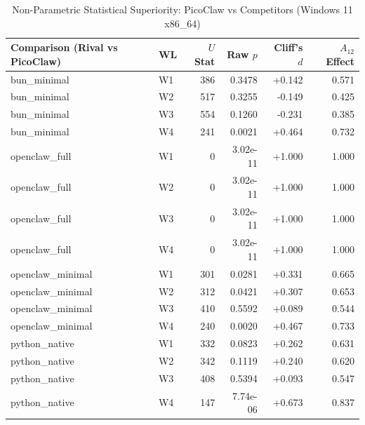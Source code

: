 \begin{table}[t]
\centering\small
\caption{Non-Parametric Statistical Superiority: PicoClaw vs Competitors (Windows 11 x86_64)}
\label{tab:Windows_stat_tests}
\begin{tabular}{llrrrr}
\toprule
Comparison (Rival vs PicoClaw) & WL & $U$ Stat & Raw $p$ & Cliff's $d$ & $A_{12}$ Effect \\
\midrule
bun\_minimal & W1 & 386 & 0.3478 & +0.142 & 0.571 \\
bun\_minimal & W2 & 517 & 0.3255 & -0.149 & 0.425 \\
bun\_minimal & W3 & 554 & 0.1260 & -0.231 & 0.385 \\
bun\_minimal & W4 & 241 & 0.0021 & +0.464 & 0.732 \\
openclaw\_full & W1 & 0 & 3.02e-11 & +1.000 & 1.000 \\
openclaw\_full & W2 & 0 & 3.02e-11 & +1.000 & 1.000 \\
openclaw\_full & W3 & 0 & 3.02e-11 & +1.000 & 1.000 \\
openclaw\_full & W4 & 0 & 3.02e-11 & +1.000 & 1.000 \\
openclaw\_minimal & W1 & 301 & 0.0281 & +0.331 & 0.665 \\
openclaw\_minimal & W2 & 312 & 0.0421 & +0.307 & 0.653 \\
openclaw\_minimal & W3 & 410 & 0.5592 & +0.089 & 0.544 \\
openclaw\_minimal & W4 & 240 & 0.0020 & +0.467 & 0.733 \\
python\_native & W1 & 332 & 0.0823 & +0.262 & 0.631 \\
python\_native & W2 & 342 & 0.1119 & +0.240 & 0.620 \\
python\_native & W3 & 408 & 0.5394 & +0.093 & 0.547 \\
python\_native & W4 & 147 & 7.74e-06 & +0.673 & 0.837 \\
\bottomrule
\end{tabular}
\end{table}
